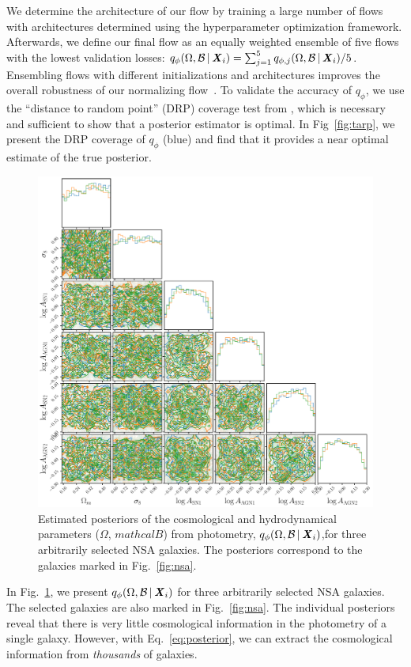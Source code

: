 We determine the architecture of our flow by training a large number of flows
with architectures determined using the \cite{akiba2019} hyperparameter optimization framework.
Afterwards, we define our final flow as an equally weighted ensemble of five
flows with the lowest validation losses: 
$q_{\phi}(\Omega, \mathcal{B}\,|\, {\textbf{\textit{X}}_i}) = 
\sum_{j=1}^5 q_{\phi,j}(\Omega, \mathcal{B}\,|\, {\textbf{\textit{X}}_i})/5$. 
Ensembling flows with different initializations and architectures improves the
overall robustness of our normalizing flow~\citep{alsing2019}.
To validate the accuracy of $q_\phi$, we use the ``distance to random point''
(DRP) coverage test from \cite{lemos2023}, which is necessary and sufficient to
show that a posterior estimator is optimal. 
In Fig~\ref{fig:tarp}, we present the DRP coverage of $q_\phi$ (blue) and
find that it provides a near optimal estimate of the true posterior.

\begin{figure}[ht]
\vskip 0.2in
\begin{center}
    \centerline{\includegraphics[width=\columnwidth]{figs/p_omega_x_i.pdf}}
    \caption{Estimated posteriors of the cosmological and hydrodynamical 
    parameters ($\Omega$, $mathcal{B}$) from photometry, 
    $q_{\phi}(\Omega, \mathcal{B}\,|\, {\textbf{\textit{X}}_i})$,for three arbitrarily 
    selected NSA galaxies. 
    The posteriors correspond to the galaxies marked in Fig.~\ref{fig:nsa}.
    }\label{fig:p_omega_x_i}
\end{center}
\vskip -0.2in
\end{figure}

In Fig.~\ref{fig:p_omega_x_i}, we present 
$q_{\phi}(\Omega, \mathcal{B}\,|\, {\textbf{\textit{X}}_i})$
for three arbitrarily selected NSA galaxies. 
The selected galaxies are also marked in Fig.~\ref{fig:nsa}. 
The individual posteriors reveal that  there is very little cosmological
information in the photometry of a single galaxy. 
However, with Eq.~\ref{eq:posterior}, we can extract the cosmological
information from {\em thousands} of galaxies.
